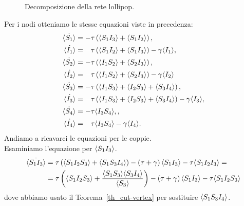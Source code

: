 \begin{figure}[!htb]
\centering
{}
\caption{Decomposizione della rete lollipop.}
\label{fig::lollipop_cut}
\end{figure}
Per i nodi otteniamo le stesse equazioni viste in precedenza:
\begingroup
\allowdisplaybreaks
 \begin{equation*}
 \begin{aligned}
 	\dot{\angol{S_1}}&= -\tau \tonde{ \angol{ S_1 I_3} + \angol{S_1 I_2}}, 
 \\ 
 	\dot{\angol{I_1}}&= \spa \tau \tonde{ \angol{ S_1 I_2} + \angol{S_1 I_3}} - \gamma\angol{I_1},
 \\
  	\dot{\angol{S_2}}&= -\tau \tonde{ \angol{ I_1 S_2} + \angol{S_2 I_3}}, 
 \\
 \dot{\angol{I_2}}&= \spa \tau \tonde{ \angol{ I_1 S_2} + \angol{S_2 I_3}} - \gamma\angol{I_2}
 \\
  \dot{\angol{S_3}}&= -\tau \tonde{ \angol{I_1 S_3} + \angol{I_2 S_3}+ \angol{S_3 I_4}},  \\
 \dot{\angol{I_3}}&= \spa \tau \tonde{ \angol{I_1 S_3} + \angol{I_2 S_3}+ \angol{S_3 I_4}}-\gamma\angol{I_3},\\
\dot{\angol{S_4}} &= -\tau \angol{I_3S_4},
  	,\quad \\
  \dot{\angol{I_4}}&=\spa \tau\angol{I_3S_4}-\gamma\angol{I_4}.
 \end{aligned}	
 \end{equation*}
\endgroup
 Andiamo a ricavarci le equazioni per le coppie.\\ Esaminiamo l'equazione per $\langle S_1 I_3 \rangle$. 
 \begin{equation*}
 \begin{aligned}	
 \dot{\langle S_1I_3 \rangle}&= \tau\left(  \langle S_1I_2S_3 \rangle + \langle S_1S_3I_4 \rangle \right) - \left(  \tau +\gamma \right)\langle S_1 I_3 \rangle -\tau \langle  S_1 I_2 I_3 \rangle= \\
 &= \tau \left(  \langle S_1I_2S_3 \rangle + \frac{ \langle S_1S_3 \rangle\langle S_3 I_4 \rangle}{\langle S_3 \rangle} \right) -\left(  \tau + \gamma \right) \langle S_1I_3 \rangle - \tau \langle S_1I_2S_3 \rangle
 \end{aligned}
 \end{equation*}
 dove abbiamo usato il Teorema~\ref{th_cut-vertex} per sostituire $\langle S_1S_3I_4 \rangle$.\\
